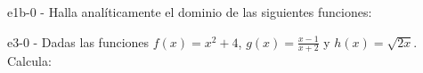 \documentclass[spanish, 11pt]{exam}
\begin{document}
\begin{questions}
\begin{multicols}{2}
\begin{parts}
        \end{parts}
        \end{multicols}
        \question e1b-0 - Halla analíticamente el dominio de las siguientes funciones:
        \begin{multicols}{3}
        \begin{parts} \part[1] $f(x)=\sqrt[3]{\frac{x + 2}{x - 3}}$  \begin{solution}   $Dom\left(f \right)=\left(-\infty, 3\right) \cup \left(3, \infty\right)$   \end{solution} \part[1] $f(x)=\sqrt {\frac{x}{2 x^{2} + 2 x - 12}}$  \begin{solution}   $Dom\left(f \right)=\left(-\infty, -3\right) \cup \left(2, \infty\right)$   \end{solution} \part[1] $f(x)=\sqrt {x^2-9}$  \begin{solution}   $Dom\left(f \right)=\left(-\infty, -3\right] \cup \left[3, \infty\right)$   \end{solution}
        \end{parts}
        \end{multicols}
        \question e3-0 - Dadas las funciones $f(x)= x^2+4$, $g(x)= \frac{{x - 1}}{{x + 2}}$ y $h(x)= \sqrt{2x}$. Calcula: 
    

\end{questions}
\end{document}
